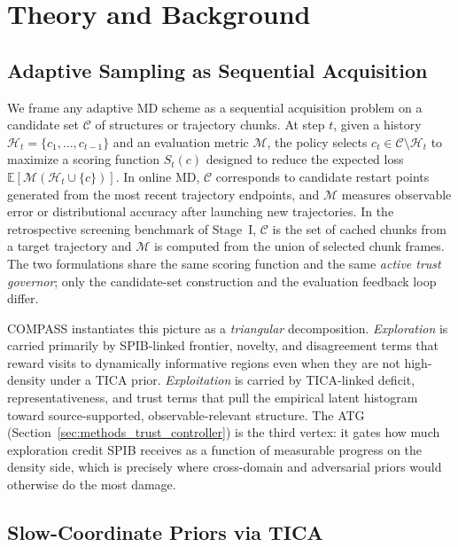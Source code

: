 \documentclass[journal=jctcce,manuscript=article,layout=twocolumn]{achemso}
\begin{document}
\section{Theory and Background}

\subsection{Adaptive Sampling as Sequential Acquisition}

We frame any adaptive MD scheme as a sequential acquisition problem on a candidate set $\mathcal{C}$ of structures or trajectory chunks. At step $t$, given a history $\mathcal{H}_t = \{c_1,\ldots,c_{t-1}\}$ and an evaluation metric $\mathcal{M}$, the policy selects $c_t \in \mathcal{C}\setminus\mathcal{H}_t$ to maximize a scoring function $S_t(c)$ designed to reduce the expected loss $\mathbb{E}[\mathcal{M}(\mathcal{H}_t \cup \{c\})]$. In online MD, $\mathcal{C}$ corresponds to candidate restart points generated from the most recent trajectory endpoints, and $\mathcal{M}$ measures observable error or distributional accuracy after launching new trajectories. In the retrospective screening benchmark of Stage~I, $\mathcal{C}$ is the set of cached chunks from a target trajectory and $\mathcal{M}$ is computed from the union of selected chunk frames. The two formulations share the same scoring function and the same \emph{active trust governor}; only the candidate-set construction and the evaluation feedback loop differ.

COMPASS instantiates this picture as a \emph{triangular} decomposition. \emph{Exploration} is carried primarily by SPIB-linked frontier, novelty, and disagreement terms that reward visits to dynamically informative regions even when they are not high-density under a TICA prior. \emph{Exploitation} is carried by TICA-linked deficit, representativeness, and trust terms that pull the empirical latent histogram toward source-supported, observable-relevant structure. The ATG (Section~\ref{sec:methods_trust_controller}) is the third vertex: it gates how much exploration credit SPIB receives as a function of measurable progress on the density side, which is precisely where cross-domain and adversarial priors would otherwise do the most damage.

\subsection{Slow-Coordinate Priors via TICA}
\end{document}
